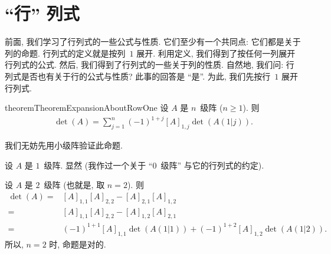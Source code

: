 \documentclass[../libro.tex]{subfiles}
\begin{document}
\section{\texorpdfstring{``行'' 列式}%
{"行" 列式}}

前面, 我们学习了行列式的一些公式与性质.
它们至少有一个共同点:
它们都是关于列的命题.
行列式的定义就是按列~\(1\) 展开.
利用定义,
我们得到了按任何一列展开行列式的公式.
然后, 我们得到了行列式的一些关于列的性质.
自然地, 我们问:
行列式是否也有关于行的公式与性质?
此事的回答是 ``是''.
为此, 我们先按行~\(1\) 展开行列式.

\begin{restatable}{theorem}{TheoremExpansionAboutRowOne}
    设 \(A\) 是 \(n\)~级阵 (\(n \geq 1\)).
    则
    \begin{align*}
        \det {(A)}
        = \sum_{j = 1}^{n} {(-1)^{1+j} [A]_{1,j} \det {(A(1|j))}}.
    \end{align*}
\end{restatable}

我们无妨先用小级阵验证此命题.

设 \(A\) 是 \(1\)~级阵.
显然
(我作过一个关于 ``\(0\)~级阵'' 与它的行列式的约定).

设 \(A\) 是 \(2\)~级阵 (也就是, 取 \(n = 2\)).
则
\begin{align*}
    \det {(A)}
    = {} &
    [A]_{1,1} [A]_{2,2} - [A]_{2,1} [A]_{1,2}
    \\
    = {} &
    [A]_{1,1} [A]_{2,2} - [A]_{1,2} [A]_{2,1}
    \\
    = {} &
    (-1)^{1+1} [A]_{1,1} \det {(A(1|1))}
    + (-1)^{1+2} [A]_{1,2} \det {(A(1|2))}.
\end{align*}
所以, \(n = 2\) 时, 命题是对的.
\end{document}
